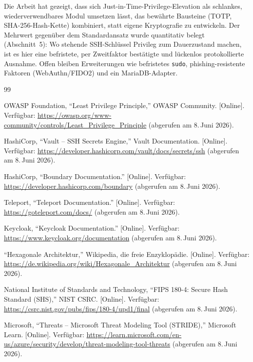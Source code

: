 \documentclass[11pt,a4paper]{article}
\begin{document}
Die Arbeit hat gezeigt, dass sich Just-in-Time-Privilege-Elevation als
schlankes, wiederverwendbares Modul umsetzen lässt, das bewährte Bausteine
(TOTP, SHA-256-Hash-Kette) kombiniert, statt eigene Kryptografie zu entwickeln.
Der Mehrwert gegenüber dem Standardansatz wurde quantitativ belegt
(Abschnitt~5): Wo stehende SSH-Schlüssel Privileg zum Dauerzustand machen, ist es
hier eine befristete, per Zweitfaktor bestätigte und lückenlos protokollierte
Ausnahme. Offen bleiben Erweiterungen wie befristetes \texttt{sudo},
phishing-resistente Faktoren (WebAuthn/FIDO2) und ein MariaDB-Adapter.

\clearpage
\renewcommand{\refname}{Literaturverzeichnis}
\begin{thebibliography}{99}
\setlength{\itemsep}{3pt}

 OWASP Foundation, ``Least Privilege Principle,'' OWASP
Community. [Online]. Verfügbar:
\url{https://owasp.org/www-community/controls/Least_Privilege_Principle}
(abgerufen am 8.\,Juni 2026).

 HashiCorp, ``Vault -- SSH Secrets Engine,'' Vault
Documentation. [Online]. Verfügbar:
\url{https://developer.hashicorp.com/vault/docs/secrets/ssh}
(abgerufen am 8.\,Juni 2026).

 HashiCorp, ``Boundary Documentation.'' [Online]. Verfügbar:
\url{https://developer.hashicorp.com/boundary} (abgerufen am 8.\,Juni 2026).

 Teleport, ``Teleport Documentation.'' [Online]. Verfügbar:
\url{https://goteleport.com/docs/} (abgerufen am 8.\,Juni 2026).

 Keycloak, ``Keycloak Documentation.'' [Online]. Verfügbar:
\url{https://www.keycloak.org/documentation} (abgerufen am 8.\,Juni 2026).

 ``Hexagonale Architektur,'' Wikipedia, die freie
Enzyklopädie. [Online]. Verfügbar:
\url{https://de.wikipedia.org/wiki/Hexagonale_Architektur}
(abgerufen am 8.\,Juni 2026).

 National Institute of Standards and Technology, ``FIPS 180-4:
Secure Hash Standard (SHS),'' NIST CSRC. [Online]. Verfügbar:
\url{https://csrc.nist.gov/pubs/fips/180-4/upd1/final}
(abgerufen am 8.\,Juni 2026).

 Microsoft, ``Threats -- Microsoft Threat Modeling Tool
(STRIDE),'' Microsoft Learn. [Online]. Verfügbar:
\url{https://learn.microsoft.com/en-us/azure/security/develop/threat-modeling-tool-threats}
(abgerufen am 8.\,Juni 2026).


\end{thebibliography}
\end{document}
